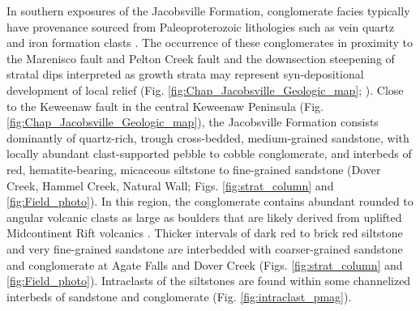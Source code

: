 In southern exposures of the Jacobsville Formation, conglomerate facies typically have provenance sourced from Paleoproterozoic lithologies such as vein quartz and iron formation clasts \citep{Hamblin1958a, Kalliokoski1982a}. The occurrence of these conglomerates in proximity to the Marenisco fault and Pelton Creek fault and the downsection steepening of stratal dips interpreted as growth strata may represent syn-depositional development of local relief (Fig. \ref{fig:Chap_Jacobsville_Geologic_map}; \citealp{Kalliokoski1982a, Hedgman1992a}). Close to the Keweenaw fault in the central Keweenaw Peninsula (Fig. \ref{fig:Chap_Jacobsville_Geologic_map}), the Jacobsville Formation consists dominantly of quartz-rich, trough cross-bedded, medium-grained sandstone, with locally abundant clast-supported pebble to cobble conglomerate, and interbeds of red, hematite-bearing, micaceous siltstone to fine-grained sandstone (Dover Creek, Hammel Creek, Natural Wall; Figs. \ref{fig:strat_column} and \ref{fig:Field_photo}). In this region, the conglomerate contains abundant rounded to angular volcanic clasts as large as boulders that are likely derived from uplifted Midcontinent Rift volcanics \citep{Irving1885a, Brojanigo1984a}. Thicker intervals of dark red to brick red siltstone and very fine-grained sandstone are interbedded with coarser-grained sandstone and conglomerate at Agate Falls and Dover Creek (Figs. \ref{fig:strat_column} and \ref{fig:Field_photo}). Intraclasts of the siltstones are found within some channelized interbeds of sandstone and conglomerate (Fig. \ref{fig:intraclast_pmag}). 

